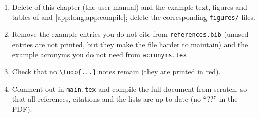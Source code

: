 \begin{enumerate}
  \item Delete  of this chapter (the user manual) and the example text, figures and tables of  and \cref{app:long,app:compile}; delete the corresponding \texttt{figures/} files.
  \item Remove the example entries you do not cite from \texttt{references.bib} (unused entries are not printed, but they make the file harder to maintain) and the example acronyms you do not need from \texttt{acronyms.tex}.
  \item Check that no \verb|\todo{...}| notes remain (they are printed in red).
  \item Comment out \verb|| in \texttt{main.tex} and compile the full document from scratch, so that all references, citations and the lists are up to date (no ``??'' in the PDF).
\end{enumerate}

